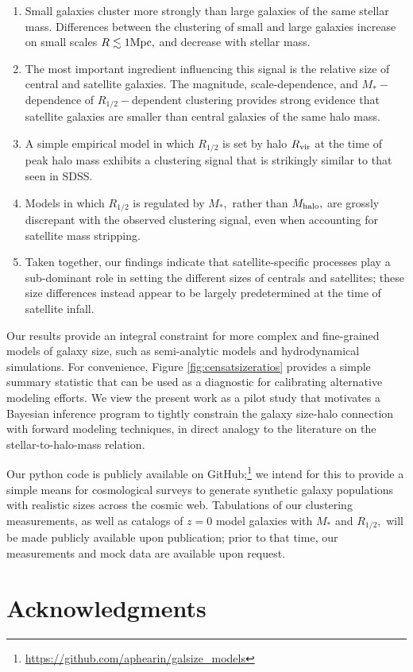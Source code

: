 \documentclass[usenatbib,usegraphicx,letterpaper]{mn2e}
\newcommand{\ben}{\begin{enumerate}}
\newcommand{\een}{\end{enumerate}}
\newcommand{\rhalf}{R_{1/2}}
\newcommand{\mstar}{M_{\ast}}
\newcommand{\mhalo}{M_{\rm halo}}
\newcommand{\rvir}{R_{\rm vir}}
\newcommand{\mpc}{{\rm Mpc}}
\begin{document}
\ben
\item Small galaxies cluster more strongly than large galaxies of the same stellar mass. Differences between the clustering of small and large galaxies increase on small scales $R\lesssim1\mpc,$ and decrease with stellar mass.
\item The most important ingredient influencing this signal is the relative size of central and satellite galaxies. The magnitude, scale-dependence, and $\mstar-$dependence of $\rhalf-$dependent clustering provides strong evidence that satellite galaxies are smaller than central galaxies of the same halo mass.
\item A simple empirical model in which $\rhalf$ is set by halo $\rvir$ at the time of peak halo mass exhibits a clustering signal that is strikingly similar to that seen in SDSS.
\item Models in which $\rhalf$ is regulated by $\mstar,$ rather than $\mhalo,$ are grossly discrepant with the observed clustering signal, even when accounting for satellite mass stripping.
\item Taken together, our findings indicate that satellite-specific processes play a sub-dominant role in setting the different sizes of centrals and satellites; these size differences instead appear to be largely predetermined at the time of satellite infall.
\een

Our results provide an integral constraint for more complex and fine-grained models of galaxy size, such as semi-analytic models and hydrodynamical simulations. For convenience, Figure \ref{fig:censatsizeratios} provides a simple summary statistic that can be used as a diagnostic for calibrating alternative modeling efforts. We view the present work as a pilot study that motivates a Bayesian inference program to tightly constrain the galaxy size-halo connection with forward modeling techniques, in direct analogy to the literature on the stellar-to-halo-mass relation.

Our python code is publicly available on GitHub;\footnote{\url{https://github.com/aphearin/galsize_models}} we intend for this to provide a simple means for cosmological surveys to generate synthetic galaxy populations with realistic sizes across the cosmic web. Tabulations of our clustering measurements, as well as catalogs of $z=0$ model galaxies with $\mstar$ and $\rhalf,$ will be made publicly available upon publication; prior to that time, our measurements and mock data are available upon request. 

\section*{Acknowledgments}
\end{document}
